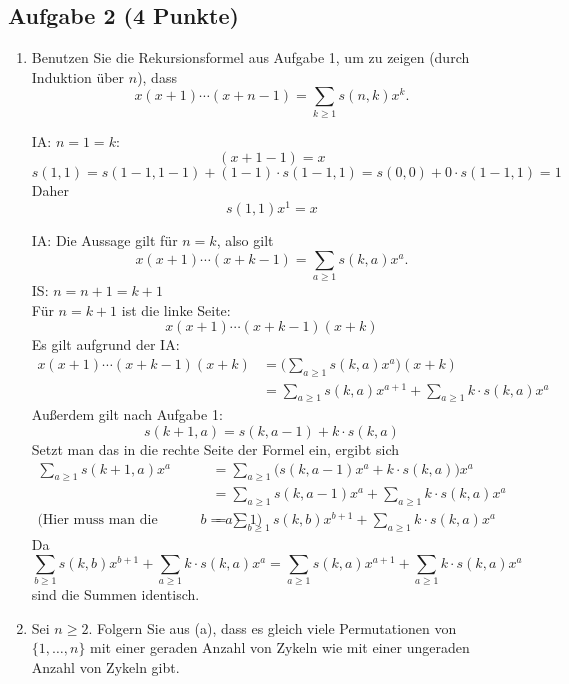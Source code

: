 \documentclass{article} %
\begin{document}
    \subsection*{Aufgabe 2 (4 Punkte)}
    \begin{enumerate}
        \item[(a)] Benutzen Sie die Rekursionsformel aus Aufgabe 1, um zu zeigen (durch Induktion über $n$), dass
        \[
        x(x + 1) \cdots (x + n - 1) = \sum_{k \geq 1} s(n, k)x^k.
        \]
        \begin{mybox}
        IA: $n = 1 = k$: \\
        \[(x+1-1) = x\]
        \[s(1,1)= s(1-1, 1-1) + (1-1) \cdot s(1-1, 1) = s(0, 0) + 0 \cdot s(1-1, 1) =  1\]
        Daher
        \[ s(1, 1)x^1 = x\]
        \end{mybox}
        \begin{mybox}
        IA: Die Aussage gilt für $n = k$, also gilt
         \[
        x(x + 1) \cdots (x + k - 1) = \sum_{a \geq 1} s(k, a)x^a.
        \]
        IS: $n = n+1 = k+1$ \\
        Für $n = k+1$ ist die linke Seite: 
        \[
         x(x + 1) \cdots (x + k - 1) (x + k)
        \]
        Es gilt aufgrund der IA: 
        \begin{align*}
            x(x + 1) \cdots (x + k - 1) (x + k)  & = \big( \sum_{a \geq 1} s(k, a)x^a \big) (x + k) \\
             & = \sum_{a \geq 1} s(k, a)x^{a+1} + \sum_{a \geq 1} k \cdot s(k, a)x^{a}
        \end{align*}
        Außerdem gilt nach Aufgabe 1: 
        \[s(k+1,a)=s(k,a-1)+k\cdot s(k,a)\]
        Setzt man das in die rechte Seite der Formel ein, ergibt sich 
        \begin{align*}
            \sum_{a \geq 1} s(k+1, a)x^{a} & = \sum_{a \geq 1}\big( s(k, a-1)x^{a} + k\cdot s(k,a) \big)x^a \\
            & = \sum_{a \geq 1} s(k, a-1)x^{a} + \sum_{a \geq 1} k\cdot s(k,a) x^a \\
            \text{(Hier muss man die Laufvariable ändern: } b = a-1) & =  \sum_{b \geq 1} s(k, b)x^{b+1} + \sum_{a \geq 1} k\cdot s(k,a) x^a  
        \end{align*}
        Da \[\sum_{b \geq 1} s(k, b)x^{b+1} + \sum_{a \geq 1} k\cdot s(k,a) x^a  = \sum_{a \geq 1} s(k, a)x^{a+1} + \sum_{a \geq 1} k \cdot s(k, a)x^{a} \] sind die Summen identisch. 
        \end{mybox}
        \item[(b)] Sei $n \geq 2$. Folgern Sie aus (a), dass es gleich viele Permutationen von $\{1, \dots, n\}$ mit einer geraden Anzahl von Zykeln wie mit einer ungeraden Anzahl von Zykeln gibt.

\end{enumerate}
\end{document}
